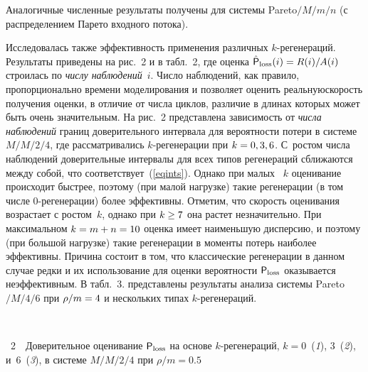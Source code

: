 \begin{multicols}{2}
Аналогичные численные результаты получены  для системы Pareto$/M/m/n$ (с
распределением Парето входного потока).



Исследовалась также эффективность применения различных $k$-ре\-ге\-не\-ра\-ций.
Результаты приведены на  рис.~2 и в табл.~2, где оценка $\hat{\p}_{\mathrm{loss}}(i)\hm=R(i)/A(i)$ 
строилась по {\it числу наблюдений}~$i$. Число
наблюдений, как правило, пропорционально времени моделирования и позволяет
оценить реальную\linebreak скорость получения оценки, в отличие от чис\-ла цик\-лов,
 различие в длинах которых может быть очень
значительным. На рис.~2 представлена зависимость от \textit{числа наблюдений }
границ доверительного интервала  для  вероятности потери в системе $M/M/2/4$,
где  рассматривались $k$-ре\-ге\-не\-ра\-ции при  $k\hm=0,3, 6$. 
С~ростом числа   наблюдений доверительные
интервалы для всех  типов регенераций сближаются между собой, что
соответствует~(\ref{eqints}). Однако при малых~ $k$ оценивание
происходит быстрее, поэтому (при малой нагрузке)  такие регенерации
(в том чис\-ле 0-ре\-ге\-не\-ра\-ции) более эффективны. 
Отметим, что скорость оценивания возрастает с ростом~$k$, однако при $k\hm\ge 7$ она растет
незначительно. При максимальном $k\hm=m\hm+n\hm=10$ оценка имеет наименьшую
дисперсию, и поэтому (при большой нагрузке) такие регенерации в
моменты потерь наиболее эффективны.  Причина состоит в том, что
классические регенерации в данном случае редки  и их использование  для оценки
вероятности ${\sf P}_{\mathrm{loss}}$ оказывается неэффективным.
В табл.~3.  пред\-став\-ле\-ны результаты
анализа системы Pareto$/M/4/6$ при $\rho/m\hm=4$ и нескольких типах
$k$-ре\-ге\-не\-раций.  %

\pagebreak

\noindent
\vspace*{-9pt}  %
 \begin{center}
 \mbox{%
 \epsfxsize=78.578mm
 }
 \end{center}
{{\figurename~2}\ \ \small{Доверительное оценивание  ${\sf P}_{\mathrm{loss}}$ на основе\protect\linebreak
$k$-ре\-ге\-нераций, $k=0$~(\textit{1}), 3~(\textit{2}), и~6~(\textit{3}),  
в сис\-те\-ме $M/M/2/4$ при $\rho/m=0.5$}}




\end{multicols}

